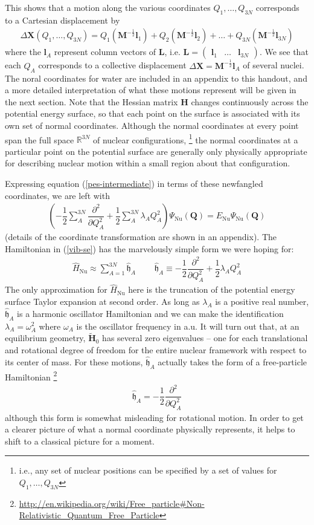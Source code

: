 \documentclass[11pt]{article}
\newcommand{\bo}[1]{\ensuremath{\mathbf{#1}}}
\renewcommand{\sp}{\ \ \ \ \ \ \ \ \ \ }
\newcommand{\fr}[2]{\dfrac{#1}{#2}}
\newcommand{\pr}[1]{\left(#1\right)}
\newcommand{\ma}[1]{\left(\begin{matrix}#1\end{matrix}\right)}
\newcommand{\pd}[3]{\ensuremath{ \dfrac{ \partial^{#1} #2 }{\partial #3 ^{#1}}}}
\newcommand{\ld}{\ensuremath{\ldots}}
\newcommand{\Nu}{\ensuremath{\mathrm{Nu}}}
\newcommand{\op}[1]{\ensuremath{\hat{#1}}}
\newcommand{\Y}{\ensuremath{\Psi}}
\newcommand{\w}{\ensuremath{\omega}}
\newcommand{\D}{\ensuremath{\Delta}}
\newcommand{\la}{\ensuremath{\lambda}}
\newcommand{\tl}[1]{\ensuremath{\tilde{#1}}}
\newcommand{\mf}[1]{\ensuremath{\mathfrak{#1}}}
\begin{document}
This shows that a motion along the various coordinates $Q_1,\ld,Q_{3N}$ corresponds to a Cartesian displacement by
\begin{align}
%
	\D\bo{X}(Q_1,\ld,Q_{3N})
=
%
	Q_1\pr{\bo{M}^{-\frac{1}{2}}\bm{l}_1}
+
	Q_2\pr{\bo{M}^{-\frac{1}{2}}\bm{l}_2}
+
	\ld
+
	Q_{3N}\pr{\bo{M}^{-\frac{1}{2}}\bm{l}_{3N}}
\end{align}
where the $\bm{l}_A$ represent column vectors of $\bo{L}$, i.e. $\bo{L}=\ma{\bm{l}_1&\ld&\bm{l}_{3N}}$.
We see that each $Q_A$ corresponds to a collective displacement $\D\bo{X}=\bo{M}^{-\frac{1}{2}}\bm{l}_A$ of several nuclei.
The noral coordinates for water are included in an appendix to this handout, and a more detailed interpretation of what these motions represent will be given in the next section.
Note that the Hessian matrix $\bo{H}$ changes continuously across the potential energy surface, so that each point on the surface is associated with its own set of normal coordinates.
Although the normal coordinates at every point span the full space $\mathbb{R}^{3N}$ of nuclear configurations, \footnote{i.e., any set of nuclear positions can be specified by a set of values for $Q_1,\ld,Q_{3N}$} the normal coordinates at a particular point on the potential surface are generally only physically appropriate for describing nuclear motion within a small region about that configuration.

Expressing equation (\ref{pes-intermediate}) in terms of these newfangled coordinates, we are left with 
\begin{align}
\label{vib-se}
\pr{
-\fr{1}{2}\sum_A^{3N}
	\pd{2}{}{Q_A}
+\fr{1}{2}\sum_A^{3N}
	\la_A Q_A^2
}
	\Y_\Nu(\bo{Q})
=
	E_\Nu
	\Y_\Nu(\bo{Q})
\end{align}
(details of the coordinate transformation are shown in an appendix).
The Hamiltonian in (\ref{vib-se}) has the marvelously simple form we were hoping for:
\begin{align}
\label{harm-hamiltonian}
%
	\op{H}_\Nu
\approx
	\sum_{A=1}^{3N}
	\op{\mf{h}}_A
\sp
%
	\op{\mf{h}}_A
\equiv
-\fr{1}{2}
	\pd{2}{}{Q_A}
+\fr{1}{2}
	\la_A Q_A^2
\end{align}
The only approximation for $\op{H}_\Nu$ here is the truncation of the potential energy surface Taylor expansion at second order.
As long as $\la_A$ is a positive real number, $\op{\mf{h}}_A$ is a harmonic oscillator Hamiltonian and we can make the identification $\la_A=\w_A^2$ where $\w_A$ is the oscillator frequency in a.u.
It will turn out that, at an equilibrium geometry, $\tl{\bo{H}}_0$ has several zero eigenvalues -- one for each translational and rotational degree of freedom for the entire nuclear framework with respect to its center of mass.
For these motions, $\op{\mf{h}}_A$ actually takes the form of a free-particle Hamiltonian \footnote{\url{http://en.wikipedia.org/wiki/Free_particle\#Non-Relativistic_Quantum_Free_Particle}}
\begin{align}
%
	\op{\mf{h}}_A
=
-\fr{1}{2}
	\pd{2}{}{Q_A}
\end{align}
although this form is somewhat misleading for rotational motion.
In order to get a clearer picture of what a normal coordinate physically represents, it helps to shift to a classical picture for a moment.
\end{document}
